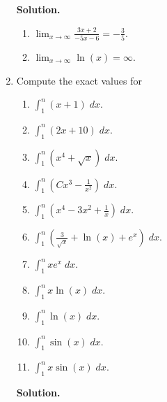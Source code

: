 \documentclass[9pt]{article}
\newcommand{\D}{\displaystyle}
\begin{document}
\begin{enumerate}
      \textbf{Solution.}

      \begin{enumerate}
         \item $\D\lim_{x \rightarrow \infty} \frac{3x + 2}{-5x - 6} =
                -\frac{3}{5}$.
         \item $\D\lim_{x \rightarrow \infty} \ln(x) = \infty$.
      \end{enumerate}
   \item Compute the exact values for

         \begin{enumerate}
            \item $\D\int_1^n(x + 1)\;dx$.
            \item $\D\int_1^n(2x + 10)\;dx$.
            \item $\D\int_1^n(x^4 + \sqrt{x})\;dx$.
            \item $\D\int_1^n\left(Cx^3 - \frac{1}{x^2}\right)\;dx$.
            \item $\D\int_1^n\left(x^4 - 3x^2 + \frac{1}{x}\right)\;dx$.
            \item $\D\int_1^n\left(\frac{3}{\sqrt{x}} +\ln(x) + e^x\right)\;dx$.
            \item $\D\int_1^nxe^x\;dx$.
            \item $\D\int_1^nx\ln(x)\;dx$.
            \item $\D\int_1^n\ln(x)\;dx$.
            \item $\D\int_1^n\sin(x)\;dx$.
            \item $\D\int_1^nx\sin(x)\;dx$.
         \end{enumerate}
      
      \textbf{Solution.}


\end{enumerate}
\end{document}

